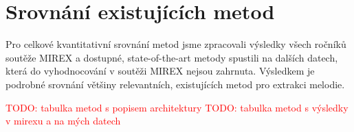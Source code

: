 \section{Srovnání existujících metod}

Pro celkové kvantitativní srovnání metod jsme zpracovali výsledky všech ročníků soutěže MIREX a dostupné, state-of-the-art metody spustili na dalších datech, která do vyhodnocování v soutěži MIREX nejsou zahrnuta. Výsledkem je podrobné srovnání většiny relevantních, existujících metod pro extrakci melodie.

\textcolor{red}{TODO: tabulka metod s popisem architektury}
\textcolor{red}{TODO: tabulka metod s výsledky v mirexu a na mých datech}


